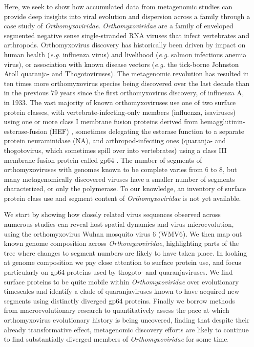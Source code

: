 \documentclass[11pt,twocolumn]{article}
\begin{document}
Here, we seek to show how accumulated data from metagenomic studies can provide deep insights into viral evolution and dispersion across a family through a case study of \textit{Orthomyxoviridae}. \textit{Orthomyxoviridae} are a family of enveloped segmented negative sense single-stranded RNA viruses that infect vertebrates and arthropods.
Orthomyxovirus discovery has historically been driven by impact on human health (\textit{e.g.} influenza virus) and livelihood (\textit{e.g.} salmon infectious anemia virus), or association with known disease vectors (\textit{e.g.} the tick-borne Johnston Atoll quaranja- and Thogotoviruses). The metagenomic revolution has resulted in ten times more orthomyxovirus species being discovered over the last decade than in the previous 79 years since the first orthomyxovirus discovery, of influenza A, in 1933. The vast majority of known orthomyxoviruses use one of two surface protein classes, with vertebrate-infecting-only members (influenza, isaviruses) using one or more class I membrane fusion proteins derived from hemagglutinin-esterase-fusion (HEF) \citep{parry_divergent_2020}, sometimes delegating the esterase function to a separate protein neuraminidase (NA), and arthropod-infecting ones (quaranja- and thogotovirus, which sometimes spill over into vertebrates) using a class III membrane fusion protein called gp64 \citep{garry_proteomics_2008}. The number of segments of orthomyxoviruses with genomes known to be complete varies from 6 to 8, but many metagenomically discovered viruses have a smaller number of segments characterized, or only the polymerase. To our knowledge, an inventory of surface protein class use and segment content of \textit{Orthomyxoviridae} is not yet available.

We start by showing how closely related virus sequences observed across numerous studies can reveal host spatial dynamics and virus microevolution, using the orthomyxovirus Wuhan mosquito virus 6 (WMV6).
We then map out known genome composition across \textit{Orthomyxoviridae}, highlighting parts of the tree where changes to segment numbers are likely to have taken place.
In looking at genome composition we pay close attention to surface protein use, and focus particularly on gp64 proteins used by thogoto- and quaranjaviruses.
We find surface proteins to be quite mobile within \textit{Orthomyxoviridae} over evolutionary timescales and identify a clade of quaranjaviruses known to have acquired new segments using distinctly diverged gp64 proteins.
Finally we borrow methods from macroevolutionary research to quantitatively assess the pace at which orthomyxovirus evolutionary history is being uncovered, finding that despite their already transformative effect, metagenomic discovery efforts are likely to continue to find substantially diverged members of \textit{Orthomyxoviridae} for some time.
\end{document}
